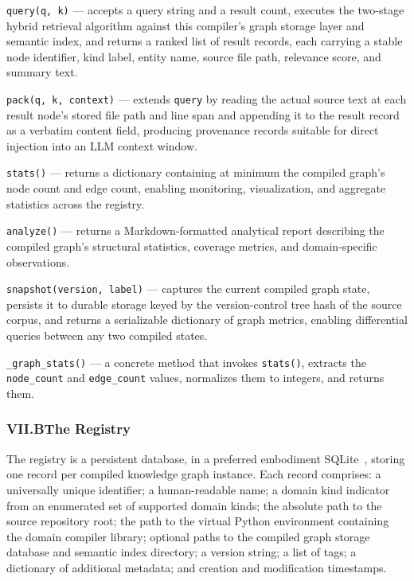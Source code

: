 \documentclass[12pt]{article}
\begin{document}
\texttt{query(q, k)} --- accepts a query string and a result count, executes the
two-stage hybrid retrieval algorithm against this compiler's graph storage layer
and semantic index, and returns a ranked list of result records, each carrying a
stable node identifier, kind label, entity name, source file path, relevance
score, and summary text.

\texttt{pack(q, k, context)} --- extends \texttt{query} by reading the actual
source text at each result node's stored file path and line span and appending it
to the result record as a verbatim content field, producing provenance records
suitable for direct injection into an LLM context window.

\texttt{stats()} --- returns a dictionary containing at minimum the compiled
graph's node count and edge count, enabling monitoring, visualization, and
aggregate statistics across the registry.

\texttt{analyze()} --- returns a Markdown-formatted analytical report describing
the compiled graph's structural statistics, coverage metrics, and domain-specific
observations.

\texttt{snapshot(version, label)} --- captures the current compiled graph state,
persists it to durable storage keyed by the version-control tree hash of the
source corpus, and returns a serializable dictionary of graph metrics, enabling
differential queries between any two compiled states.

\texttt{\_graph\_stats()} --- a concrete method that invokes \texttt{stats()},
extracts the \texttt{node\_count} and \texttt{edge\_count} values, normalizes
them to integers, and returns them.

\subsubsection{VII.B\quad The Registry}

The registry is a persistent database, in a preferred embodiment
SQLite~\cite{sqlite}, storing one record per compiled knowledge graph instance.
Each record comprises: a universally unique identifier; a human-readable name;
a domain kind indicator from an enumerated set of supported domain kinds; the
absolute path to the source repository root; the path to the virtual Python
environment containing the domain compiler library; optional paths to the
compiled graph storage database and semantic index directory; a version string;
a list of tags; a dictionary of additional metadata; and creation and
modification timestamps.
\end{document}
